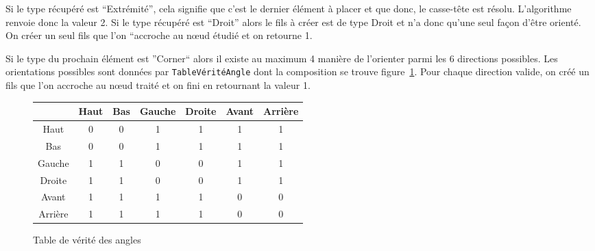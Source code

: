 Si le type récupéré est ``Extrémité'', cela signifie que c'est le dernier élément à placer et que donc, le casse-tête est résolu. L'algorithme renvoie donc la valeur 2. Si le type récupéré est ``Droit'' alors le fils à créer est de type Droit et n'a donc qu'une seul façon d'être orienté. On créer un seul fils que l'on ``accroche au nœud étudié et on retourne 1.

Si le type du prochain élément est ''Corner`` alors il existe au maximum 4 manière de l'orienter parmi les 6 directions possibles. Les orientations possibles sont données par \verb|TableVéritéAngle| dont la composition se trouve figure~\ref{truthTable}. Pour chaque direction valide, on créé un fils que l'on accroche au nœud traité et on fini en retournant la valeur 1.

\begin{figure}
\begin{center}
\begin{tabular}{|*{7}{c|}}
\hline
~ & Haut & Bas & Gauche & Droite & Avant & Arrière \\
\hline
Haut & 0 & 0 & 1 & 1 & 1 & 1 \\
\hline
Bas & 0 & 0 & 1 & 1 & 1 & 1 \\
\hline
Gauche & 1 & 1 & 0 & 0 & 1 & 1 \\
\hline
Droite & 1 & 1 & 0 & 0 & 1 & 1 \\
\hline
Avant & 1 & 1 & 1 & 1 & 0 & 0 \\
\hline
Arrière & 1 & 1 & 1 & 1 & 0 & 0 \\
\hline
\end{tabular}
\end{center}
\caption{Table de vérité des angles}
\label{truthTable}
\end{figure}
